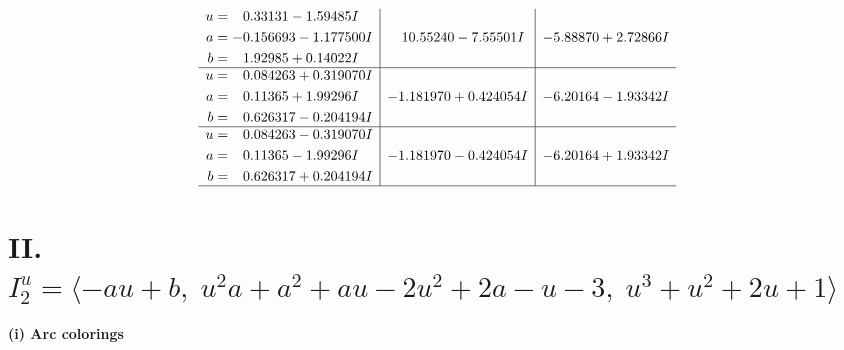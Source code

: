 \documentclass[1p]{elsarticle_modified}
\theoremstyle{definition}
\begin{document}
$$\begin{array}{c|c|c}
\begin{aligned}
u &= \phantom{-}0.33131 - 1.59485 I \\
a &= -0.156693 - 1.177500 I \\
b &= \phantom{-}1.92985 + 0.14022 I\end{aligned}
 & \phantom{-}10.55240 - 7.55501 I & -5.88870 + 2.72866 I \\ \hline\begin{aligned}
u &= \phantom{-}0.084263 + 0.319070 I \\
a &= \phantom{-}0.11365 + 1.99296 I \\
b &= \phantom{-}0.626317 - 0.204194 I\end{aligned}
 & -1.181970 + 0.424054 I & -6.20164 - 1.93342 I \\ \hline\begin{aligned}
u &= \phantom{-}0.084263 - 0.319070 I \\
a &= \phantom{-}0.11365 - 1.99296 I \\
b &= \phantom{-}0.626317 + 0.204194 I\end{aligned}
 & -1.181970 - 0.424054 I & -6.20164 + 1.93342 I\\
 \hline 
 \end{array}$$\newpage\newpage\renewcommand{\arraystretch}{1}
\centering \section*{II. $I^u_{2}= \langle - a u+b,\;u^2 a+a^2+a u-2 u^2+2 a- u-3,\;u^3+u^2+2 u+1 \rangle$}
\flushleft \textbf{(i) Arc colorings}\\
\end{document}
